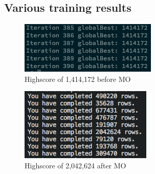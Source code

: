 \documentclass[12pt]{article}
\numberwithin{table}{section}
\numberwithin{figure}{section}
\begin{document}
\subsection{Various training results}
\begin{figure}[H]
\centering
\includegraphics[scale = 1]{1_4mil_score.png}
\caption{Highscore of 1,414,172 before MO}
\end{figure}

\begin{figure}[H]
\centering
\includegraphics[scale = 1]{2mil_score.png}
\caption{Highscore of 2,042,624 after MO}
\end{figure}

\newpage
\printbibliography
\end{document}
